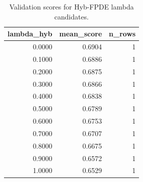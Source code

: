 \begin{table}[t]
\caption{Validation scores for Hyb-FPDE lambda candidates.}
\label{tab:lambda_distribution_computed}
\centering
\begin{tabular}{rrr}
\toprule
lambda\_hyb & mean\_score & n\_rows \\
\midrule
0.0000 & 0.6904 & 1 \\
0.1000 & 0.6886 & 1 \\
0.2000 & 0.6875 & 1 \\
0.3000 & 0.6866 & 1 \\
0.4000 & 0.6838 & 1 \\
0.5000 & 0.6789 & 1 \\
0.6000 & 0.6753 & 1 \\
0.7000 & 0.6707 & 1 \\
0.8000 & 0.6675 & 1 \\
0.9000 & 0.6572 & 1 \\
1.0000 & 0.6529 & 1 \\
\bottomrule
\end{tabular}

\end{table}
